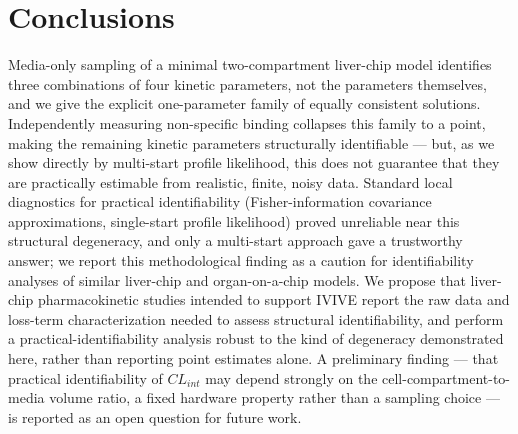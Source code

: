 \section*{Conclusions}

Media-only sampling of a minimal two-compartment liver-chip model identifies three combinations of four kinetic parameters, not the parameters themselves, and we give the explicit one-parameter family of equally consistent solutions. Independently measuring non-specific binding collapses this family to a point, making the remaining kinetic parameters structurally identifiable --- but, as we show directly by multi-start profile likelihood, this does not guarantee that they are practically estimable from realistic, finite, noisy data. Standard local diagnostics for practical identifiability (Fisher-information covariance approximations, single-start profile likelihood) proved unreliable near this structural degeneracy, and only a multi-start approach gave a trustworthy answer; we report this methodological finding as a caution for identifiability analyses of similar liver-chip and organ-on-a-chip models. We propose that liver-chip pharmacokinetic studies intended to support IVIVE report the raw data and loss-term characterization needed to assess structural identifiability, and perform a practical-identifiability analysis robust to the kind of degeneracy demonstrated here, rather than reporting point estimates alone. A preliminary finding --- that practical identifiability of $CL_{int}$ may depend strongly on the cell-compartment-to-media volume ratio, a fixed hardware property rather than a sampling choice --- is reported as an open question for future work.
